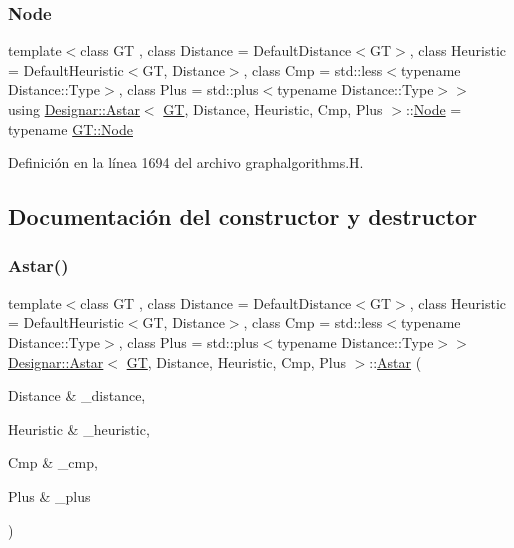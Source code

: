 \subsubsection{\texorpdfstring{Node}{Node}}
{\footnotesize\ttfamily template$<$class GT , class Distance  = Default\+Distance$<$\+G\+T$>$, class Heuristic  = Default\+Heuristic$<$\+G\+T, Distance$>$, class Cmp  = std\+::less$<$typename Distance\+::\+Type$>$, class Plus  = std\+::plus$<$typename Distance\+::\+Type$>$$>$ \\
using \hyperlink{class_designar_1_1_astar}{Designar\+::\+Astar}$<$ \hyperlink{demo-buildgraph_8_c_a3001c40d2c31ca87ed96cd7d1334a55e}{GT}, Distance, Heuristic, Cmp, Plus $>$\+::\hyperlink{class_designar_1_1_astar_a0d4cdf6b94255824c6c93e5ae18e9eb7}{Node} =  typename \hyperlink{class_designar_1_1_graph_a5dfc7dba9d092ac489c72e40390c37d0}{G\+T\+::\+Node}}



Definición en la línea 1694 del archivo graphalgorithms.\+H.



\subsection{Documentación del constructor y destructor}
\mbox{\label{class_designar_1_1_astar_a9a684bbaa799da107f42ed8e048cac57}} 
\subsubsection{\texorpdfstring{Astar()}{Astar()}\hspace{0.1cm}{\footnotesize\ttfamily [1/2]}}
{\footnotesize\ttfamily template$<$class GT , class Distance  = Default\+Distance$<$\+G\+T$>$, class Heuristic  = Default\+Heuristic$<$\+G\+T, Distance$>$, class Cmp  = std\+::less$<$typename Distance\+::\+Type$>$, class Plus  = std\+::plus$<$typename Distance\+::\+Type$>$$>$ \\
\hyperlink{class_designar_1_1_astar}{Designar\+::\+Astar}$<$ \hyperlink{demo-buildgraph_8_c_a3001c40d2c31ca87ed96cd7d1334a55e}{GT}, Distance, Heuristic, Cmp, Plus $>$\+::\hyperlink{class_designar_1_1_astar}{Astar} (\begin{DoxyParamCaption}\item[{Distance \&}]{\+\_\+distance,  }\item[{Heuristic \&}]{\+\_\+heuristic,  }\item[{Cmp \&}]{\+\_\+cmp,  }\item[{Plus \&}]{\+\_\+plus }\end{DoxyParamCaption})\hspace{0.3cm}{\ttfamily [inline]}}



